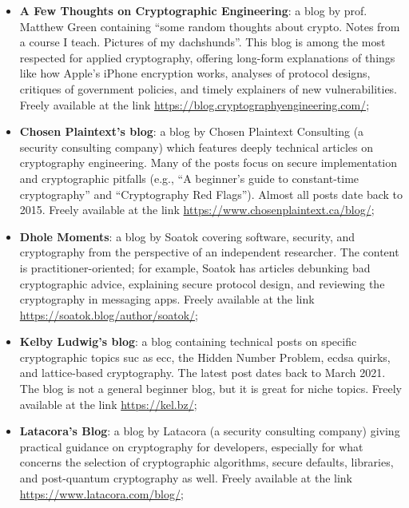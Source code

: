 \begin{itemize}
	
	\item \textbf{A Few Thoughts on Cryptographic Engineering}: a blog by prof. Matthew Green containing ``some random thoughts about crypto. Notes from a course I teach. Pictures of my dachshunds''. This blog is among the most respected for applied cryptography, offering long-form explanations of things like how Apple's iPhone encryption works, analyses of protocol designs, critiques of government policies, and timely explainers of new vulnerabilities. Freely available at the link \url{https://blog.cryptographyengineering.com/};
	
	\item \textbf{Chosen Plaintext's blog}: a blog by Chosen Plaintext Consulting (a security consulting company) which features deeply technical articles on cryptography engineering. Many of the posts focus on secure implementation and cryptographic pitfalls (e.g., ``A beginner's guide to constant-time cryptography'' and ``Cryptography Red Flags''). Almost all posts date back to 2015. Freely available at the link \url{https://www.chosenplaintext.ca/blog/};
	
	\item \textbf{Dhole Moments}: a blog by Soatok covering software, security, and cryptography from the perspective of an independent researcher. The content is practitioner-oriented; for example, Soatok has articles debunking bad cryptographic advice, explaining secure protocol design, and reviewing the cryptography in messaging apps. Freely available at the link \url{https://soatok.blog/author/soatok/};
	
	\item \textbf{Kelby Ludwig's blog}: a blog containing technical posts on specific cryptographic topics suc as \gls{ecc}, the Hidden Number Problem, \gls{ecdsa} quirks, and lattice-based cryptography. The latest post dates back to March 2021. The blog is not a general beginner blog, but it is great for niche topics. Freely available at the link \url{https://kel.bz/};
	
	\item \textbf{Latacora's Blog}: a blog by Latacora (a security consulting company) giving practical guidance on cryptography for developers, especially for what concerns the selection of cryptographic algorithms, secure defaults, libraries, and post-quantum cryptography as well. Freely available at the link \url{https://www.latacora.com/blog/};
	

\end{itemize}
